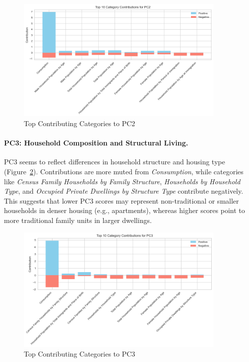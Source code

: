 \documentclass{article}
\begin{document}
\begin{figure}[H]
    \centering
    \includegraphics[width=0.9\textwidth]{figures/pc2_contribs.png}
    \caption{Top Contributing Categories to PC2}
    \label{fig:pc2}
\end{figure}

\paragraph{PC3: Household Composition and Structural Living.}  
PC3 seems to reflect differences in household structure and housing type (Figure~\ref{fig:pc3}). Contributions are more muted from \textit{Consumption}, while categories like \textit{Census Family Households by Family Structure}, \textit{Households by Household Type}, and \textit{Occupied Private Dwellings by Structure Type} contribute negatively. This suggests that lower PC3 scores may represent non-traditional or smaller households in denser housing (e.g., apartments), whereas higher scores point to more traditional family units in larger dwellings.

\begin{figure}[H]
    \centering
    \includegraphics[width=0.9\textwidth]{figures/pc3_contribs.png}
    \caption{Top Contributing Categories to PC3}
    \label{fig:pc3}
\end{figure}
\end{document}
